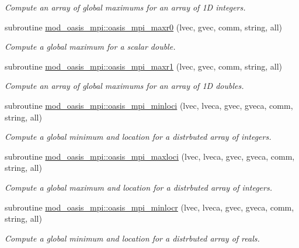 \begin{DoxyCompactItemize}
\begin{DoxyCompactList}\small\item\em Compute an array of global maximums for an array of 1D integers. \end{DoxyCompactList}\item 
subroutine \hyperlink{namespacemod__oasis__mpi_a7f46e23956ff948e039c5c1cdde0f6f3}{mod\+\_\+oasis\+\_\+mpi\+::oasis\+\_\+mpi\+\_\+maxr0} (lvec, gvec, comm, string, all)
\begin{DoxyCompactList}\small\item\em Compute a global maximum for a scalar double. \end{DoxyCompactList}\item 
subroutine \hyperlink{namespacemod__oasis__mpi_ae57151fc4714e33d7e0e1cf0aa65ae64}{mod\+\_\+oasis\+\_\+mpi\+::oasis\+\_\+mpi\+\_\+maxr1} (lvec, gvec, comm, string, all)
\begin{DoxyCompactList}\small\item\em Compute an array of global maximums for an array of 1D doubles. \end{DoxyCompactList}\item 
subroutine \hyperlink{namespacemod__oasis__mpi_a355bbf47408d38b356455c2368ec0f1b}{mod\+\_\+oasis\+\_\+mpi\+::oasis\+\_\+mpi\+\_\+minloci} (lvec, lveca, gvec, gveca, comm, string, all)
\begin{DoxyCompactList}\small\item\em Compute a global minimum and location for a distrbuted array of integers. \end{DoxyCompactList}\item 
subroutine \hyperlink{namespacemod__oasis__mpi_a103579b46cc544dc29fb6643bf23237c}{mod\+\_\+oasis\+\_\+mpi\+::oasis\+\_\+mpi\+\_\+maxloci} (lvec, lveca, gvec, gveca, comm, string, all)
\begin{DoxyCompactList}\small\item\em Compute a global maximum and location for a distrbuted array of integers. \end{DoxyCompactList}\item 
subroutine \hyperlink{namespacemod__oasis__mpi_a6808017043f4531bf0d470b25bdff94b}{mod\+\_\+oasis\+\_\+mpi\+::oasis\+\_\+mpi\+\_\+minlocr} (lvec, lveca, gvec, gveca, comm, string, all)
\begin{DoxyCompactList}\small\item\em Compute a global minimum and location for a distrbuted array of reals. \end{DoxyCompactList}\item 

\end{DoxyCompactItemize}
